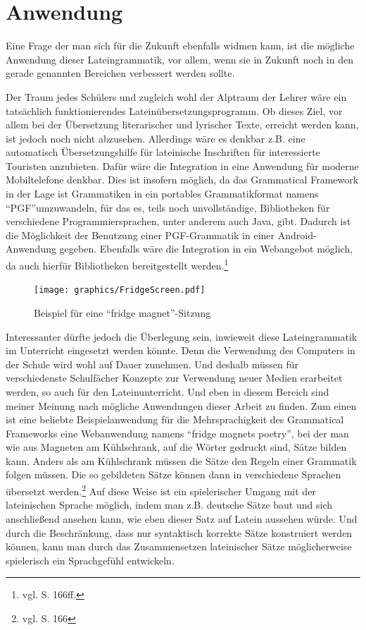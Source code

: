 \section{Anwendung}
Eine Frage der man sich für die Zukunft ebenfalls widmen kann, ist die mögliche Anwendung dieser Lateingrammatik, vor allem, wenn sie in Zukunft noch in den gerade genannten Bereichen verbessert werden sollte. \par
Der Traum jedes Schülers und zugleich wohl der Alptraum der Lehrer wäre ein tatsächlich funktionierendes Lateinübersetzungsprogramm. Ob dieses Ziel, vor allem bei der Übersetzung literarischer und lyrischer Texte, erreicht werden kann, ist jedoch noch nicht abzusehen. Allerdings wäre es denkbar z.B. eine automatisch Übersetzungshilfe für lateinische Inschriften für interessierte Touristen anzubieten. Dafür wäre die Integration in eine Anwendung für moderne Mobiltelefone denkbar. Dies ist insofern möglich, da das Grammatical Framework in der Lage ist Grammatiken in ein portables Grammatikformat namens "`PGF"'umzuwandeln, für das es, teils noch unvollständige, Bibliotheken für verschiedene Programmiersprachen, unter anderem auch Java, gibt. Dadurch ist die Möglichkeit der Benutzung einer PGF-Grammatik in einer Android-Anwendung gegeben. Ebenfalls wäre die Integration in ein Webangebot möglich, da auch hierfür Bibliotheken bereitgestellt werden.\footnote{vgl. \cite{RANTA2011} S. 166ff.} \par
\begin{figure}
\texttt{[image: graphics/FridgeScreen.pdf]}
\caption{Beispiel für eine "`fridge magnet"'-Sitzung}\label{Fridge}
\end{figure}
Interessanter dürfte jedoch die Überlegung sein, inwieweit diese Lateingrammatik im Unterricht eingesetzt werden könnte. Denn die Verwendung des Computers in der Schule wird wohl auf Dauer zunehmen. Und deshalb müssen für verschiedenste Schulfächer Konzepte zur Verwendung neuer Medien erarbeitet werden, so auch für den Lateinunterricht. Und eben in diesem Bereich sind meiner Meinung nach mögliche Anwendungen dieser Arbeit zu finden. Zum einen ist eine beliebte Beispielanwendung für die Mehrsprachigkeit des Grammatical Frameworks eine Webanwendung namens "`fridge magnets poetry"', bei der man wie aus Magneten am Kühlschrank, auf die Wörter gedruckt sind, Sätze bilden kann. Anders als am Kühlschrank müssen die Sätze den Regeln einer Grammatik folgen müssen. Die so gebildeten Sätze können dann in verschiedene Sprachen übersetzt werden.\footnote{vgl. \cite{RANTA2011} S. 166} Auf diese Weise ist ein spielerischer Umgang mit der lateinischen Sprache möglich, indem man z.B. deutsche Sätze baut und sich anschließend ansehen kann, wie eben dieser Satz auf Latein aussehen würde. Und durch die Beschränkung, dass nur syntaktisch korrekte Sätze konstruiert werden können, kann man durch das Zusammensetzen lateinischer Sätze möglicherweise spielerisch ein Sprachgefühl entwickeln. \par

